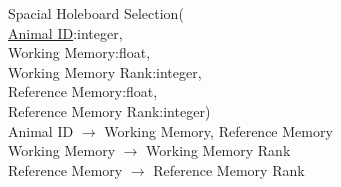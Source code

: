 \documentclass[12pt]{article}
\begin{document}
	\indent Spacial Holeboard Selection(\\
	\indent\indent \underline{Animal ID}:integer,\\
	\indent\indent Working Memory:float,\\
	\indent\indent Working Memory Rank:integer,\\
	\indent\indent Reference Memory:float,\\
	\indent\indent Reference Memory Rank:integer)\\
	\indent Animal ID $\rightarrow$ Working Memory, Reference Memory\\
	\indent Working Memory $\rightarrow$ Working Memory Rank\\
	\indent Reference Memory $\rightarrow$ Reference Memory Rank\\ 
		
\end{document}
